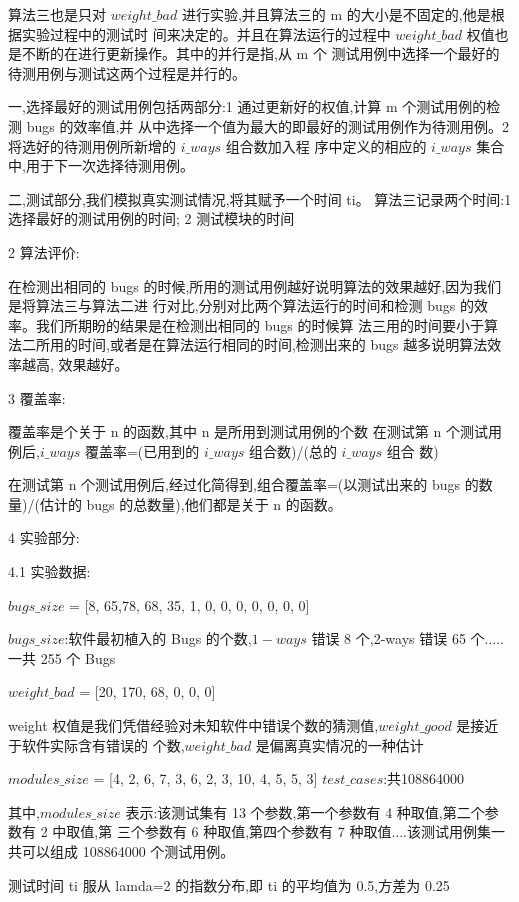 \documentclass[10pt,journal,letterpaper,compsoc]{IEEEtran}
\begin{document}
\begin{CJK}{UTF8}{gkai}
算法三也是只对 $weight\_bad$ 进行实验,并且算法三的 m 的大小是不固定的,他是根据实验过程中的测试时
间来决定的。并且在算法运行的过程中 $weight\_bad$ 权值也是不断的在进行更新操作。其中的并行是指,从 m 个
测试用例中选择一个最好的待测用例与测试这两个过程是并行的。

一,选择最好的测试用例包括两部分:1 通过更新好的权值,计算 m 个测试用例的检测 bugs 的效率值,并
从中选择一个值为最大的即最好的测试用例作为待测用例。2 将选好的待测用例所新增的 $i\_ways$ 组合数加入程
序中定义的相应的 $i\_ways$ 集合中,用于下一次选择待测用例。

二,测试部分,我们模拟真实测试情况,将其赋予一个时间 ti。
算法三记录两个时间:1 选择最好的测试用例的时间; 2 测试模块的时间

2 算法评价:

在检测出相同的 bugs 的时候,所用的测试用例越好说明算法的效果越好,因为我们是将算法三与算法二进
行对比,分别对比两个算法运行的时间和检测 bugs 的效率。我们所期盼的结果是在检测出相同的 bugs 的时候算
法三用的时间要小于算法二所用的时间,或者是在算法运行相同的时间,检测出来的 bugs 越多说明算法效率越高,
效果越好。

3 覆盖率:

覆盖率是个关于 n 的函数,其中 n 是所用到测试用例的个数
在测试第 n 个测试用例后,$i\_ways$ 覆盖率=(已用到的 $i\_ways$ 组合数)/(总的 $i\_ways$ 组合
数)

在测试第 n 个测试用例后,经过化简得到,组合覆盖率=(以测试出来的 bugs 的数量)/(估计的
bugs 的总数量),他们都是关于 n 的函数。

4 实验部分:

4.1 实验数据:

$bugs\_size$ = [8, 65,78, 68, 35, 1, 0, 0, 0, 0, 0, 0, 0]

$bugs\_size$:软件最初植入的 Bugs 的个数,$1-ways$ 错误 8 个,2-ways 错误 65 个.....一共 255 个
Bugs

$weight\_bad$ = [20, 170, 68, 0, 0, 0]

weight 权值是我们凭借经验对未知软件中错误个数的猜测值,$weight\_good$ 是接近于软件实际含有错误的
个数,$weight\_bad$ 是偏离真实情况的一种估计

$modules\_size$ = [4, 2, 6, 7, 3, 6, 2, 3, 10, 4, 5, 5, 3]
$test\_cases$:共108864000

其中,$modules\_size$ 表示:该测试集有 13 个参数,第一个参数有 4 种取值,第二个参数有 2 中取值,第
三个参数有 6 种取值,第四个参数有 7 种取值....该测试用例集一共可以组成 108864000 个测试用例。

测试时间 ti 服从 lamda=2 的指数分布,即 ti 的平均值为 0.5,方差为 0.25


\end{CJK}
\end{document}
